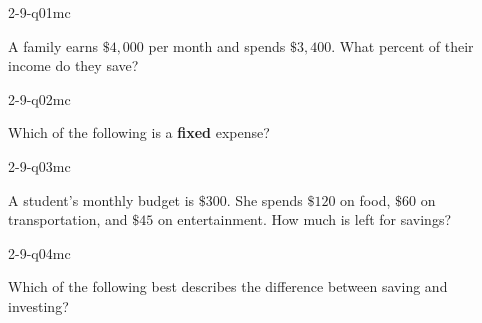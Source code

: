 

\begin{practiceQuestion}{2-9-q01}{mc}
\begin{questionText}
A family earns $\$4{,}000$ per month and spends $\$3{,}400$. What percent of their income do they save?
\end{questionText}
\end{practiceQuestion}

\begin{practiceQuestion}{2-9-q02}{mc}
\begin{questionText}
Which of the following is a \textbf{fixed} expense?
\end{questionText}
\end{practiceQuestion}

\begin{practiceQuestion}{2-9-q03}{mc}
\begin{questionText}
A student's monthly budget is $\$300$. She spends $\$120$ on food, $\$60$ on transportation, and $\$45$ on entertainment. How much is left for savings?
\end{questionText}
\end{practiceQuestion}

\begin{practiceQuestion}{2-9-q04}{mc}
\begin{questionText}
Which of the following best describes the difference between saving and investing?
\end{questionText}
\end{practiceQuestion}


